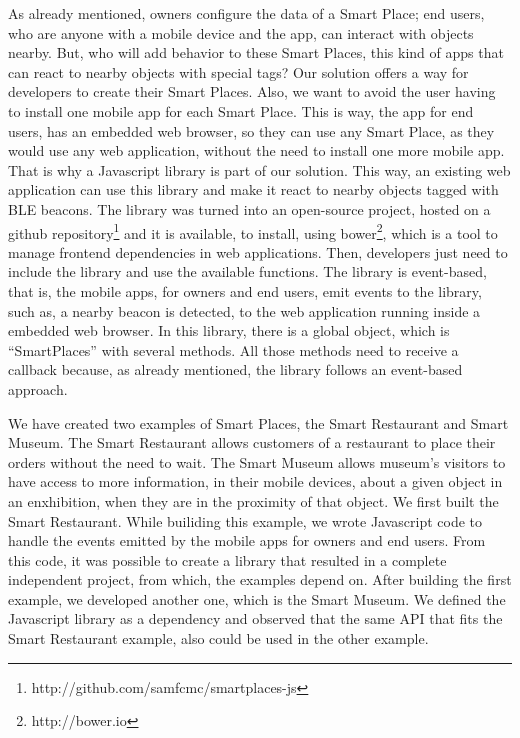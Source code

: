 As already mentioned, owners configure the data of a Smart Place; end users, who are anyone with a mobile device and the app, can interact with objects nearby.
But, who will add behavior to these Smart Places, this kind of apps that can react to nearby objects with special tags?
Our solution offers a way for developers to create their Smart Places.
Also, we want to avoid the user having to install one mobile app for each Smart Place.
This is way, the app for end users,
has an embedded web browser, so they can use any Smart Place, as they would use any web application, without the need to install one more mobile app.
That is why a Javascript library is part of our solution.
This way, an existing web application can use this library and make it react to nearby objects tagged with \gls{BLE} beacons.
The library was turned into an open-source project, hosted on a github repository\footnote{http://github.com/samfcmc/smartplaces-js} and it is available, to install, using bower\footnote{http://bower.io}, which is a tool to manage frontend dependencies in web applications.
Then, developers just need to include the library and use the available functions.
The library is event-based, that is, the mobile apps, for owners and end users, emit events to the library, such as, a nearby beacon is detected, to the web application running inside a embedded web browser.
In this library, there is a global object, which is ``SmartPlaces'' with several methods.
All those methods need to receive a callback because, as already mentioned, the library follows an event-based approach.

We have created two examples of Smart Places, the Smart Restaurant and Smart Museum.
The Smart Restaurant allows customers of a restaurant to place their orders without the need to wait.
The Smart Museum allows museum's visitors to have access to more information, in their mobile devices, about a given object in an enxhibition, when they are in the proximity of that object.
We first built the Smart Restaurant.
While builiding this example, we wrote Javascript code to handle the events emitted by the mobile apps for owners and end users.
From this code, it was possible to create a library that resulted in a complete independent project, from which, the examples depend on.
After building the first example, we developed another one, which is the Smart Museum.
We defined the Javascript library as a dependency and observed that the same \gls{API} that fits the Smart Restaurant example, also could be used in the other example.
